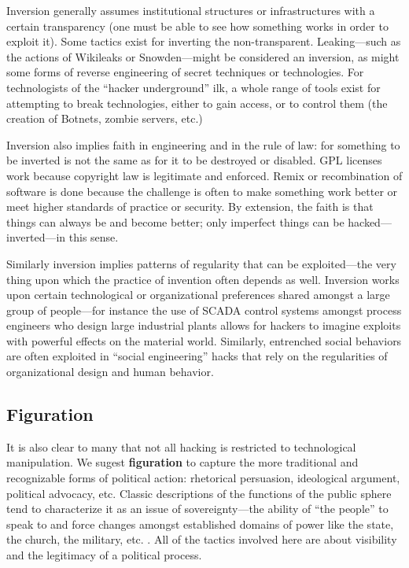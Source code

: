 \documentclass[10pt,letter,oneside]{scrartcl}
\begin{document}
Inversion generally assumes institutional structures or infrastructures with a
certain transparency (one must be able to see how something works in order to
exploit it).  Some tactics exist for inverting the
non-transparent. Leaking---such as the actions of Wikileaks or Snowden---might
be considered an inversion, as might some forms of reverse engineering of secret
techniques or technologies.  For technologists of the ``hacker underground''
ilk, a whole range of tools exist for attempting to break technologies, either
to gain access, or to control them (the creation of Botnets, zombie servers,
etc.)

Inversion also implies faith in engineering and in the rule of law: for
something to be inverted is not the same as for it to be destroyed or disabled.
GPL licenses work because copyright law is legitimate and enforced.  Remix or
recombination of software is done because the challenge is often to make
something work better or meet higher standards of practice or security.  By
extension, the faith is that things can always be and become better; only
imperfect things can be hacked--- inverted---in this sense.

Similarly inversion implies patterns of regularity that can be exploited---the
very thing upon which the practice of invention often depends as well.
Inversion works upon certain technological or organizational preferences shared
amongst a large group of people---for instance the use of SCADA control systems
amongst process engineers who design large industrial plants allows for hackers
to imagine exploits with powerful effects on the material world.  Similarly,
entrenched social behaviors are often exploited in ``social engineering'' hacks
that rely on the regularities of organizational design and human behavior.

\subsection*{Figuration}

It is also clear to many that not all hacking is restricted to technological
manipulation. We sugest \textbf{figuration} to capture the more traditional and
recognizable forms of political action: rhetorical persuasion, ideological
argument, political advocacy, etc.  Classic descriptions of the functions of the
public sphere tend to characterize it as an issue of sovereignty---the ability
of ``the people'' to speak to and force changes amongst established domains of
power like the state, the church, the military,
etc. \cite{anderson2006imagined}.  All of the tactics involved here are about
visibility and the legitimacy of a political process.
\end{document}

